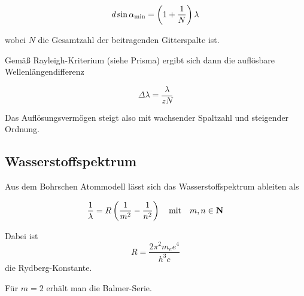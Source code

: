 \documentclass[a4paper,german,12pt,smallheadings]{scrartcl}
\begin{document}
\begin{equation}
  d \sin \alpha_\text{min} = \del{1 + \frac{1}{N}} \lambda
\end{equation}

wobei $N$ die Gesamtzahl der beitragenden Gitterspalte ist.

Gemäß Rayleigh-Kriterium (siehe Prisma) ergibt sich dann die auflösbare
Wellenlängendifferenz

\begin{equation}
  \Delta \lambda = \frac{\lambda}{z N}
\end{equation}

Das Auflösungsvermögen steigt also mit wachsender Spaltzahl und steigender Ordnung.

\subsection{Wasserstoffspektrum}

Aus dem Bohrschen Atommodell lässt sich das Wasserstoffspektrum ableiten als

\begin{equation}
  \frac{1}{\lambda} = R \del{ \frac{1}{m^2} - \frac{1}{n^2}}
  \quad \text{mit} \quad m,n \in \mathbf{N}
\end{equation}

Dabei ist
\begin{equation}
  R = \frac{2 \pi^2 m_e e^4}{h^3 c}
\end{equation}
die Rydberg-Konstante.

Für $m = 2$ erhält man die Balmer-Serie.
\end{document}
